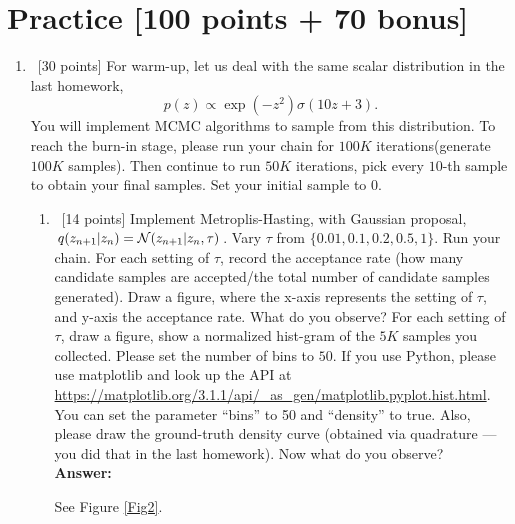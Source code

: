 \documentclass[12pt, fullpage,letterpaper]{article}
\def\red{\color{black!30!red}}
\def\blackblue{\color{black!40!blue}}
\begin{document}
\section*{Practice  [100 points + 70 bonus]}	
\label{sec:q1}
\begin{enumerate}
	\item~[30 points] For warm-up, let us deal with the same scalar distribution in the last homework, 
	\[
	p(z) \propto \exp(-z^2)\sigma(10z + 3).
	\]
	You will implement MCMC algorithms to sample from this distribution. To reach the burn-in stage, please run your chain for $100K$ iterations(\ie generate $100K$ samples). Then continue to run $50K$ iterations, pick every $10$-th sample to obtain your final samples.  Set your initial sample to $0$.
	\begin{enumerate}
		\item~[14 points] Implement Metroplis-Hasting, with Gaussian proposal, $q(z_{n+1}|z_n) = \mathcal{N}(z_{n+1}|z_{n}, \tau)$. Vary $\tau$ from $\{0.01, 0.1, 0.2, 0.5, 1\}$. Run your chain. For each setting of $\tau$, record the acceptance rate (\ie how many candidate samples are accepted/the total number of candidate samples generated). Draw a figure, where the x-axis represents the setting of $\tau$, and y-axis the acceptance rate. What do you observe?
		For each setting of $\tau$, draw a figure, show a normalized hist-gram of the $5K$ samples you collected. Please set the number of bins to $50$. If you use Python, please use matplotlib and look up the API at \url{https://matplotlib.org/3.1.1/api/_as_gen/matplotlib.pyplot.hist.html}. You can set the parameter ``bins'' to 50 and ``density'' to true. Also, please draw the ground-truth density curve (obtained via quadrature --- you did that in the last homework). Now what do you observe?\\
{\bf \red Answer: }{\blackblue 
See  Figure \ref{Fig2}. 
	\begin{figure}[H]
	\begin{center}

\end{center}
\end{figure}}
\end{enumerate}
\end{enumerate}
\end{document}
